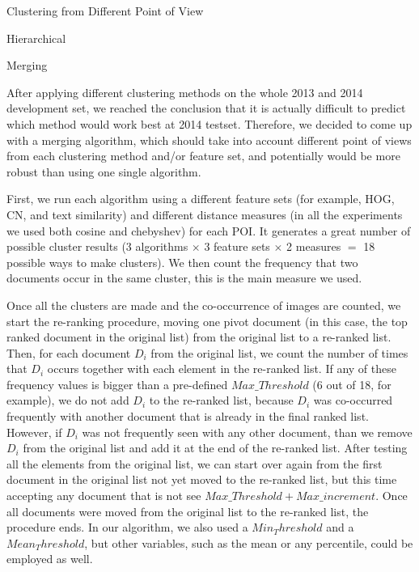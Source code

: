 \begin{subsection}{Clustering from Different Point of View}
\begin{subsubsection}{Hierarchical}
\end{subsubsection}

\begin{subsubsection}{Merging}

After applying different clustering methods on the whole 2013 and 2014 development set, 
we reached the conclusion that it is actually difficult to predict which method would work best at 2014 testset.
Therefore, we decided to come up with a merging algorithm, which should take into account different point of views from each clustering method and/or feature set,
and potentially would be more robust than using one single algorithm.

First, we run each algorithm using a different feature sets (for example, HOG, CN, and text similarity) and different distance measures (in all the experiments we used both cosine and chebyshev) for each POI. It generates a great number of possible cluster results (3 algorithms $\times$ 3 feature sets $\times$ 2 measures $=$ 18 possible ways to make clusters). 
We then count the frequency that two documents occur in the same cluster, this is the main measure we used.

Once all the clusters are made and the co-occurrence of images are counted, we start the re-ranking procedure, moving one pivot document (in this case, the top ranked document in the original list) from the original list to a re-ranked list. Then, for each document $D_i$ from the original list, we count the number of times that $D_i$ occurs together with each element in the re-ranked list. 
If any of these frequency values is bigger than a pre-defined $Max\_Threshold$ (6 out of 18, for example), we do not add $D_i$ to the re-ranked list, because $D_i$ was co-occurred frequently with another document that is already in the final ranked list. However, if $D_i$ was not frequently seen with any other document, than we remove $D_i$ from the original list and add it at the end of the re-ranked list.
After testing all the elements from the original list, we can start over again from the first document in the original list not yet moved to the re-ranked list, but this time accepting any document that is not see $Max\_Threshold + Max\_increment$. Once all documents were moved from the original list to the re-ranked list, the procedure ends.
In our algorithm, we also used a $Min_Threshold$ and a $Mean_Threshold$, but other variables, such as the mean or any percentile, could be employed as well.



\end{subsubsection}
\end{subsection}
